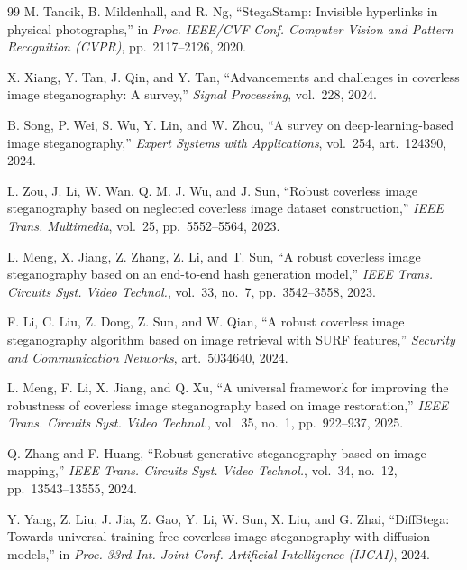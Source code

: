 \documentclass[10pt]{article}
\begin{document}
\begin{thebibliography}{99}
M. Tancik, B. Mildenhall, and R. Ng,
``StegaStamp: Invisible hyperlinks in physical photographs,''
in \emph{Proc. IEEE/CVF Conf. Computer Vision and Pattern Recognition (CVPR)}, pp.~2117--2126, 2020.

X. Xiang, Y. Tan, J. Qin, and Y. Tan,
``Advancements and challenges in coverless image steganography: A survey,''
\emph{Signal Processing}, vol.~228, 2024.

B. Song, P. Wei, S. Wu, Y. Lin, and W. Zhou,
``A survey on deep-learning-based image steganography,''
\emph{Expert Systems with Applications}, vol.~254, art.~124390, 2024.

L. Zou, J. Li, W. Wan, Q. M. J. Wu, and J. Sun,
``Robust coverless image steganography based on neglected coverless image dataset construction,''
\emph{IEEE Trans. Multimedia}, vol.~25, pp.~5552--5564, 2023.

L. Meng, X. Jiang, Z. Zhang, Z. Li, and T. Sun,
``A robust coverless image steganography based on an end-to-end hash generation model,''
\emph{IEEE Trans. Circuits Syst. Video Technol.}, vol.~33, no.~7, pp.~3542--3558, 2023.

F. Li, C. Liu, Z. Dong, Z. Sun, and W. Qian,
``A robust coverless image steganography algorithm based on image retrieval with SURF features,''
\emph{Security and Communication Networks}, art.~5034640, 2024.

L. Meng, F. Li, X. Jiang, and Q. Xu,
``A universal framework for improving the robustness of coverless image steganography based on image restoration,''
\emph{IEEE Trans. Circuits Syst. Video Technol.}, vol.~35, no.~1, pp.~922--937, 2025.

Q. Zhang and F. Huang,
``Robust generative steganography based on image mapping,''
\emph{IEEE Trans. Circuits Syst. Video Technol.}, vol.~34, no.~12, pp.~13543--13555, 2024.

Y. Yang, Z. Liu, J. Jia, Z. Gao, Y. Li, W. Sun, X. Liu, and G. Zhai,
``DiffStega: Towards universal training-free coverless image steganography with diffusion models,''
in \emph{Proc. 33rd Int. Joint Conf. Artificial Intelligence (IJCAI)}, 2024.

\end{thebibliography}
\end{document}
